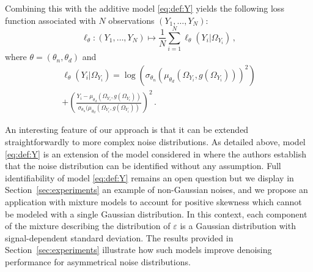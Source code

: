 \documentclass{article}
\begin{document}
Combining this with the additive model  \eqref{eq:def:Y} yields the following loss function associated with $N$ observations $(Y_1,\ldots,Y_N)$:
$$
\ell_{\theta}: (Y_1,\ldots,Y_N) \mapsto \frac{1}{N}\sum_{i=1}^N \ell_{\theta}(Y_i|\Omega_{Y_i})\,,
$$
where $\theta = (\theta_n,\theta_d)$ and
\begin{multline*}
\ell_{\theta}(Y_i|\Omega_{Y_i}) = \log(\sigma_{\theta_n}( \mu_{\theta_d}(\Omega_{Y_i},g(\Omega_{Y_i})))^2) \\
+ \left(\frac{Y_i-\mu_{\theta_d}(\Omega_{Y_i},g(\Omega_{Y_i}))}{\sigma_{\theta_n}(\mu_{\theta_d}(\Omega_{Y_i},g(\Omega_{Y_i}))}\right)^2\,. %
\end{multline*}

An interesting  feature of our approach is that it can be extended straightforwardly to more complex noise distributions. As detailed above, model \eqref{eq:def:Y} is an extension of the model considered in \cite{gassiat:lecorff:lehericy:2021} where the authors establish that the noise distribution can be identified without any assumption. Full identifiability of model \eqref{eq:def:Y} remains an open question but we display in Section~\ref{sec:experiments} an example of non-Gaussian noises, and we propose an application with mixture models  to account for positive skewness which cannot be modeled with a single Gaussian distribution. In this context, each component of the mixture describing the distribution of $\varepsilon$ is a Gaussian distribution with signal-dependent standard deviation. The results provided in Section~\ref{sec:experiments} illustrate how such models improve denoising performance for asymmetrical noise distributions.
\end{document}
